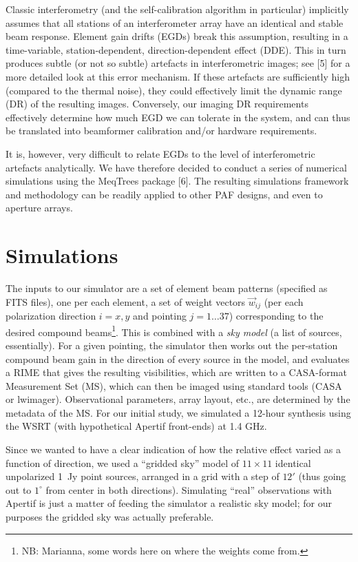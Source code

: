 \documentclass{aps2010} \special{papersize=8.5in,11in}
\begin{document}
Classic interferometry (and the self-calibration algorithm in particular) implicitly assumes that all stations of an interferometer array have an identical and stable beam response. Element gain drifts (EGDs) break this assumption, resulting in a time-variable, station-dependent, direction-dependent effect (DDE). This in turn produces subtle (or not so subtle) artefacts in interferometric images; see [5] for a more detailed look at this error mechanism. If these artefacts are sufficiently high (compared to the thermal noise), they could effectively limit the dynamic range
(DR) of the resulting images. Conversely, our imaging DR requirements effectively determine how much EGD we can tolerate in the system, and can thus be translated into beamformer calibration and/or hardware requirements.

It is, however, very difficult to relate EGDs to the level of interferometric artefacts analytically. We have therefore decided to conduct a series of numerical simulations using the MeqTrees package [6]. The resulting simulations framework and methodology
can be readily applied to other PAF designs, and even to aperture arrays.

\section{Simulations}

The inputs to our simulator are a set of element beam patterns (specified as FITS files), one per each element, a set of weight vectors $\vec w_{ij}$ (per each polarization direction $i=x,y$ and pointing $j=1\ldots37$) corresponding to the desired compound beams\footnote{NB: Marianna, some words here on where the weights come from.}. This is combined with a {\em sky model} (a list of sources, essentially). For a given pointing, the simulator then works out the per-station compound beam gain in the direction of every source in the model, and evaluates a RIME that gives the resulting visibilities, which are written to a CASA-format Measurement Set (MS), which can then be imaged using standard tools (CASA or lwimager). Observational parameters, array layout, etc., are determined by the metadata of the MS. For our initial study, we simulated a 12-hour synthesis using the WSRT (with hypothetical Apertif front-ends) at 1.4 GHz. 

Since we wanted to have a clear indication of how the relative effect varied as a function of direction, we used a ``gridded sky'' model of $11\times11$ identical unpolarized 1~Jy point sources, arranged in a grid with a step of $12'$ (thus going out to $1^\circ$ from center in both directions). Simulating ``real'' observations with Apertif is just a matter of feeding the simulator a realistic sky model; for our purposes the gridded sky was actually preferable.
\end{document}
